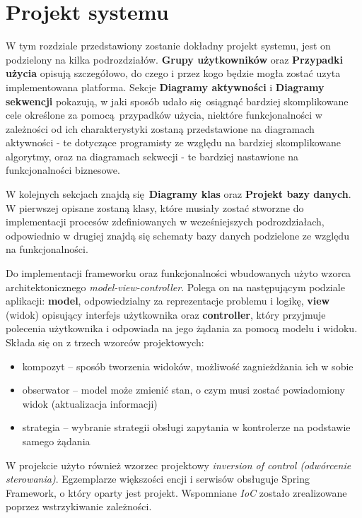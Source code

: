 
\chapter{Projekt systemu}
\thispagestyle{chapterBeginStyle}

W tym rozdziale przedstawiony zostanie dokładny projekt systemu, jest on podzielony na kilka podrozdziałów. \textbf{Grupy użytkowników} oraz \textbf{Przypadki użycia} opisują szczegółowo, do czego i przez kogo będzie mogła zostać uzyta implementowana platforma. Sekcje \textbf{Diagramy aktywności} i \textbf{Diagramy sekwencji} pokazują, w jaki sposób udało się osiągnąć bardziej skomplikowane cele określone za pomocą przypadków użycia, niektóre funkcjonalności w zależności od ich charakterystyki zostaną przedstawione na diagramach aktywności - te dotyczące programisty ze względu na bardziej skomplikowane algorytmy, oraz na diagramach sekwecji - te bardziej nastawione na funkcjonalności biznesowe.

W kolejnych sekcjach znajdą się \textbf{Diagramy klas} oraz \textbf{Projekt bazy danych}. W pierwszej opisane zostaną klasy, które musiały zostać stworzne do implementacji procesów zdefiniowanych w wcześniejszych podrozdziałach, odpowiednio w drugiej znajdą się schematy bazy danych podzielone ze względu na funkcjonalności.

Do implementacji frameworku oraz funkcjonalności wbudowanych użyto wzorca architektonicznego \textit{model-view-controller}. Polega on na następującym podziale aplikacji: \textbf{model}, odpowiedzialny za reprezentacje problemu i logikę, \textbf{view} (widok) opisujący interfejs użytkownika oraz \textbf{controller}, który przyjmuje polecenia użytkownika i odpowiada na jego żądania za pomocą modelu i widoku. Składa się on z trzech wzorców projektowych:
\begin{itemize}
	\item kompozyt -- sposób tworzenia widoków, możliwość zagnieżdżania ich w sobie
	\item obserwator -- model może zmienić stan, o czym musi zostać powiadomiony widok (aktualizacja informacji)
	\item strategia -- wybranie strategii obsługi zapytania w kontrolerze na podstawie samego żądania
\end{itemize}
W projekcie użyto również wzorzec projektowy \textit{inversion of control (odwórcenie sterowania)}. Egzemplarze większości encji i serwisów obsługuje Spring Framework, o który oparty jest projekt. Wspomniane \textit{IoC} zostało zrealizowane poprzez wstrzykiwanie zależności. 

